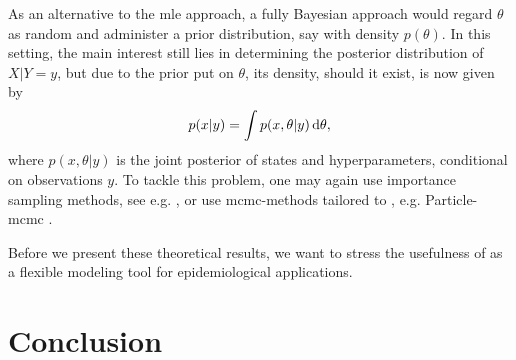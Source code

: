 As an alternative to the \acrshort{mle} approach, a fully Bayesian approach would regard $\theta$ as random and administer a prior distribution, say with density $p(\theta)$. In this setting, the main interest still lies in determining the posterior distribution of $X|Y=y$, but due to the prior put on $\theta$, its density, should it exist, is now given by
$$
p(x|y) = \int p(x,\theta|y) \,\mathrm d \theta,
$$
where $p(x,\theta|y)$ is the joint posterior of states and hyperparameters, conditional on observations $y$. To tackle this problem, one may again use importance sampling methods, see e.g. \citep[Chapter 13.1]{Durbin2012Time}, or use \acrshort{mcmc}-methods tailored to , e.g. Particle-\acrshort{mcmc} \citep[Chapter 16]{Chopin2020Introduction}.

Before we present these theoretical results, we want to stress the usefulness of  as a flexible modeling tool for epidemiological applications. 






%



\section{Conclusion}
\label{sec:03_conclusion}

